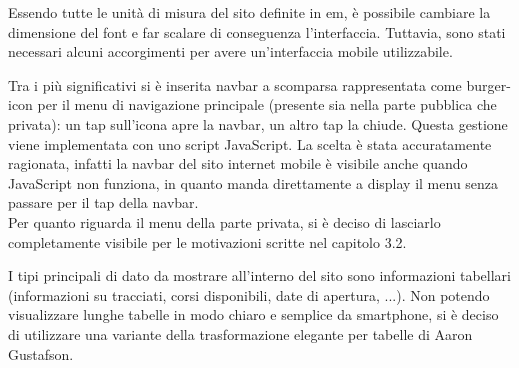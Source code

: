 Essendo tutte le unità di misura del sito definite in em, è possibile cambiare la dimensione del font e far scalare di conseguenza l’interfaccia. Tuttavia, sono stati necessari alcuni accorgimenti per avere un’interfaccia mobile utilizzabile.

Tra i più significativi si è inserita navbar a scomparsa rappresentata come burger-icon per il menu di navigazione principale (presente sia nella parte pubblica che privata): un tap sull'icona apre la navbar, un altro tap la chiude. Questa gestione viene implementata con uno script JavaScript. La scelta è stata accuratamente ragionata, infatti la navbar del sito internet mobile è visibile anche quando JavaScript non funziona, in quanto manda direttamente a display il menu senza passare per il tap della navbar.\\
Per quanto riguarda il menu della parte privata, si è deciso di lasciarlo completamente visibile per le motivazioni scritte nel capitolo 3.2.

I tipi principali di dato da mostrare all'interno del sito sono informazioni tabellari (informazioni su tracciati, corsi disponibili, date di apertura, ...). Non potendo visualizzare lunghe tabelle in modo chiaro e semplice da smartphone, si è deciso di utilizzare una variante della trasformazione elegante per tabelle di Aaron Gustafson.